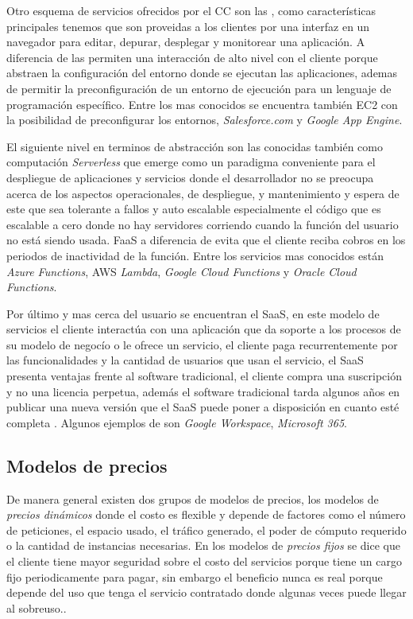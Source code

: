 Otro esquema de servicios ofrecidos por el \acrshort{CC} son las  , como características principales tenemos que son proveidas a los clientes por una interfaz en un navegador para editar, depurar, desplegar y monitorear una aplicación.\cite[p.1]{lawton2008developing} A diferencia de las  permiten una interacción de alto nivel con el cliente porque abstraen la configuración del entorno donde se ejecutan las aplicaciones, ademas de permitir la preconfiguración de un entorno de ejecución para un lenguaje de programación específico. Entre los  mas conocidos se encuentra también \acrshort{EC2} con la posibilidad de preconfigurar los entornos,  \emph{Salesforce.com} y \emph{Google App Engine}. \bigskip

El siguiente nivel en terminos de abstracción son las  conocidas también como computación \emph{Serverless} \cite[p.1]{lynn2017preliminary} que emerge como un paradigma conveniente para el despliegue de aplicaciones y servicios donde el desarrollador no se preocupa acerca de los aspectos operacionales, de despliegue, y mantenimiento y espera de este que sea tolerante a fallos y auto escalable especialmente el código que es escalable a cero donde no hay servidores corriendo cuando la función del usuario no está siendo usada. \acrshort{FaaS} a diferencia de  evita que el cliente reciba cobros en los periodos de inactividad de la función.\cite[p.5]{Baldini2017} Entre los servicios mas conocidos están \emph{Azure Functions}, \acrshort{AWS} \emph{Lambda}, \emph{Google Cloud Functions} y \emph{Oracle Cloud Functions}.\bigskip

Por último y mas cerca del usuario se encuentran el \acrfull{SaaS}, en este modelo de servicios el cliente interactúa con una aplicación que da soporte a los procesos de su modelo de negocío o le ofrece un servicio, el cliente paga recurrentemente por las funcionalidades y la cantidad de usuarios que usan el servicio, el \acrshort{SaaS} presenta ventajas frente al software tradicional, el cliente compra una suscripción y no una licencia perpetua, además el software tradicional tarda algunos años en publicar una nueva versión que el \acrshort{SaaS} puede poner a disposición en cuanto esté completa \cite[p.1]{choudhary2007software}. Algunos ejemplos de  son \emph{Google Workspace}, \emph{Microsoft 365}. \bigskip

\subsection{Modelos de precios}
De manera general existen dos grupos de modelos de precios, los modelos de \emph{precios dinámicos} donde el costo es flexible y depende de factores como el número de peticiones, el espacio usado, el tráfico generado, el poder de cómputo requerido o la cantidad de instancias necesarias. En los modelos de \emph{precios fijos} se dice que el cliente tiene mayor seguridad sobre el costo del servicios porque tiene un cargo fijo periodicamente para pagar, sin embargo el beneficio nunca es real porque depende del uso que tenga el servicio contratado donde algunas veces puede llegar al sobreuso.\cite[p.4]{soni2017pricing}.\bigskip


